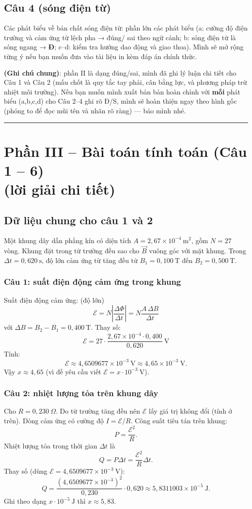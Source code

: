 \documentclass[12pt,a4paper]{article}
\begin{document}
\bigskip
\subsection*{Câu 4 (sóng điện từ)}
Các phát biểu về bản chất sóng điện từ: phần lớn các phát biểu (a: cường độ điện trường và cảm ứng từ lệch pha → đúng/ sai theo ngữ cảnh; b: sóng điện từ là sóng ngang → \textbf{Đ}; c--d: kiểm tra hướng dao động và giao thoa). Mình sẽ mở rộng từng ý nếu bạn muốn đưa vào tài liệu in kèm đáp án chính thức.

\vspace{6pt}
\noindent\textbf{(Ghi chú chung)}: phần II là dạng đúng/sai, mình đã ghi lý luận chi tiết cho Câu 1 và Câu 2 (mấu chốt là quy tắc tay phải, cân bằng lực, và phương pháp trừ nhiệt môi trường). Nếu bạn muốn mình xuất bản bản hoàn chỉnh với \textbf{mỗi} phát biểu (a,b,c,d) cho Câu 2--4 ghi rõ Đ/S, mình sẽ hoàn thiện ngay theo hình gốc (phóng to để đọc mũi tên và nhãn rõ ràng) — báo mình nhé.

\hrule
\section*{Phần III -- Bài toán tính toán (Câu 1 -- 6) \\ \small (lời giải chi tiết)}
\subsection*{Dữ liệu chung cho câu 1 và 2}
Một khung dây dẫn phẳng kín có diện tích $A=2{,}67\times10^{-4}\ \mathrm{m^2}$, gồm $N=27$ vòng. Khung đặt trong từ trường đều sao cho $\vec B$ vuông góc với mặt khung. Trong $\Delta t=0{,}620\ \mathrm{s}$, độ lớn cảm ứng từ tăng đều từ $B_1=0{,}100\ \mathrm{T}$ đến $B_2=0{,}500\ \mathrm{T}$.

\subsubsection*{Câu 1: suất điện động cảm ứng trong khung}
Suất điện động cảm ứng: (độ lớn)
\[
\mathcal{E}=N\left|\frac{\Delta\Phi}{\Delta t}\right|
= N\frac{A\,\Delta B}{\Delta t}
\]
với $\Delta B=B_2-B_1=0{,}400\ \mathrm{T}$. Thay số:
\[
\mathcal{E}=27\cdot\frac{2{,}67\times10^{-4}\cdot 0{,}400}{0{,}620}
\ \mathrm{V}
\]
Tính:
\[
\mathcal{E}\approx 4{,}6509677\times10^{-3}\ \mathrm{V}\approx 4{,}65\times10^{-3}\ \mathrm{V}.
\]
Vậy $x\approx 4{,}65$ (vì đề yêu cầu viết $\mathcal{E}=x\cdot10^{-3}\ \mathrm{V}$).

\subsubsection*{Câu 2: nhiệt lượng tỏa trên khung dây}
Cho $R=0{,}230\ \Omega$. Do từ trường tăng đều nên $\mathcal{E}$ lấy giá trị không đổi (tính ở trên). Dòng cảm ứng có cường độ $I=\mathcal{E}/R$. Công suất tiêu tán trên khung:
\[
P=\frac{\mathcal{E}^2}{R}.
\]
Nhiệt lượng tỏa trong thời gian $\Delta t$ là
\[
Q=P\Delta t=\frac{\mathcal{E}^2}{R}\Delta t.
\]
Thay số (dùng $\mathcal{E}=4{,}6509677\times10^{-3}\ \mathrm{V}$):
\[
Q=\frac{(4{,}6509677\times10^{-3})^2}{0{,}230}\cdot 0{,}620
\approx 5{,}8311003\times10^{-5}\ \mathrm{J}.
\]
Ghi theo dạng $x\cdot10^{-5}\ \mathrm{J}$ thì $x\approx 5{,}83$.
\end{document}
